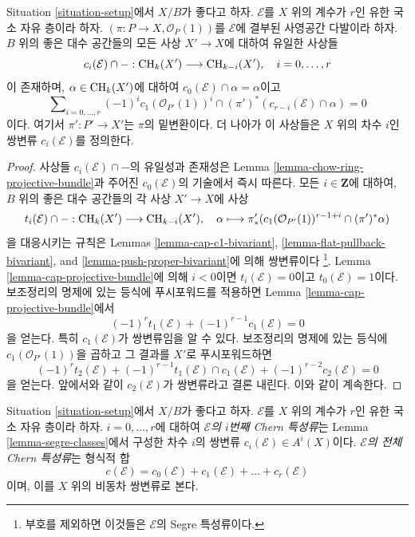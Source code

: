 \begin{lemma}
\label{lemma-segre-classes}
Situation \ref{situation-setup}에서 $X/B$가 좋다고 하자.
$\mathcal{E}$를 $X$ 위의 계수가 $r$인 유한 국소 자유 층이라 하자.
$(\pi : P \to X, \mathcal{O}_P(1))$를 $\mathcal{E}$에 결부된
사영공간 다발이라 하자. $B$ 위의 좋은 대수 공간들의 모든 사상
$X' \to X$에 대하여 유일한 사상들
$$
c_i(\mathcal{E}) \cap - : \mathop{\mathrm{CH}}\nolimits_k(X') \longrightarrow \mathop{\mathrm{CH}}\nolimits_{k - i}(X'),\quad
i = 0, \ldots, r
$$
이 존재하며, $\alpha \in \mathop{\mathrm{CH}}\nolimits_k(X')$에 대하여
$c_0(\mathcal{E}) \cap \alpha = \alpha$이고
$$
\sum\nolimits_{i = 0, \ldots, r}
(-1)^i c_1(\mathcal{O}_{P'}(1))^i \cap
(\pi')^*\left(c_{r - i}(\mathcal{E}) \cap \alpha\right) = 0
$$
이다.
여기서 $\pi' : P' \to X'$는 $\pi$의 밑변환이다.
더 나아가 이 사상들은 $X$ 위의 차수 $i$인 쌍변류
$c_i(\mathcal{E})$를 정의한다.
\end{lemma}

\begin{proof}
사상들 $c_i(\mathcal{E}) \cap -$의 유일성과 존재성은 Lemma
\ref{lemma-chow-ring-projective-bundle}과 주어진
$c_0(\mathcal{E})$의 기술에서 즉시 따른다.
모든 $i \in \mathbf{Z}$에 대하여, $B$ 위의 좋은 대수 공간들의
각 사상 $X' \to X$에 사상
$$
t_i(\mathcal{E}) \cap - :
\mathop{\mathrm{CH}}\nolimits_k(X') \longrightarrow \mathop{\mathrm{CH}}\nolimits_{k - i}(X'),\quad
\alpha \longmapsto
\pi'_*(c_1(\mathcal{O}_{P'}(1))^{r - 1 + i} \cap (\pi')^*\alpha)
$$
을 대응시키는 규칙은 Lemmas \ref{lemma-cap-c1-bivariant},
\ref{lemma-flat-pullback-bivariant}, and
\ref{lemma-push-proper-bivariant}에 의해 쌍변류이다
\footnote{부호를 제외하면 이것들은 $\mathcal{E}$의 Segre 특성류이다.}.
Lemma \ref{lemma-cap-projective-bundle}에 의해
$i < 0$이면 $t_i(\mathcal{E}) = 0$이고 $t_0(\mathcal{E}) = 1$이다.
보조정리의 명제에 있는 등식에 푸시포워드를 적용하면
Lemma \ref{lemma-cap-projective-bundle}에서
$$
(-1)^r t_1(\mathcal{E}) + (-1)^{r - 1}c_1(\mathcal{E}) = 0
$$
을 얻는다. 특히 $c_1(\mathcal{E})$가 쌍변류임을 알 수 있다.
보조정리의 명제에 있는 등식에
$c_1(\mathcal{O}_{P'}(1))$을 곱하고 그 결과를 $X'$로
푸시포워드하면
$$
(-1)^r t_2(\mathcal{E}) +
(-1)^{r - 1} t_1(\mathcal{E}) \cap c_1(\mathcal{E}) +
(-1)^{r - 2} c_2(\mathcal{E}) = 0
$$
을 얻는다. 앞에서와 같이 $c_2(\mathcal{E})$가 쌍변류라고
결론 내린다. 이와 같이 계속한다.
\end{proof}

\begin{definition}
\label{definition-chern-classes}
Situation \ref{situation-setup}에서 $X/B$가 좋다고 하자.
$\mathcal{E}$를 $X$ 위의 계수가 $r$인 유한 국소 자유 층이라 하자.
$i = 0, \ldots, r$에 대하여 {\it $\mathcal{E}$의 $i$번째 Chern 특성류}는
Lemma \ref{lemma-segre-classes}에서 구성한 차수 $i$의 쌍변류
$c_i(\mathcal{E}) \in A^i(X)$이다.
{\it $\mathcal{E}$의 전체 Chern 특성류}는 형식적 합
$$
c(\mathcal{E}) =
c_0(\mathcal{E}) + c_1(\mathcal{E}) + \ldots + c_r(\mathcal{E})
$$
이며, 이를 $X$ 위의 비동차 쌍변류로 본다.
\end{definition}

